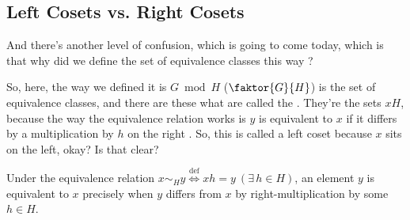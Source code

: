 \subsection{Left Cosets vs. Right Cosets}

\begin{speech}[00:02:53 - 00:03:38]
And there's another level of confusion, which is going to come today, which is that why did we define the set of equivalence classes this way ?

So, here, the way we defined it is $G \bmod H$ ($\faktor{G}{H}$) is the set of equivalence classes, and there are these what are called the . They're the sets $xH$, because the way the equivalence relation works is $y$ is equivalent to $x$ if it differs by a multiplication by $h$ on the right . So, this is called a left coset because $x$ sits on the left, okay? Is that clear?
\end{speech}

\begin{content}
Under the equivalence relation $x \sim_H y \stackrel{\text{def}}{\iff} xh = y \ (\exists\, h \in H)$, an element $y$ is equivalent to $x$ precisely when $y$ differs from $x$ by right-multiplication by some $h \in H$.

\end{content}

